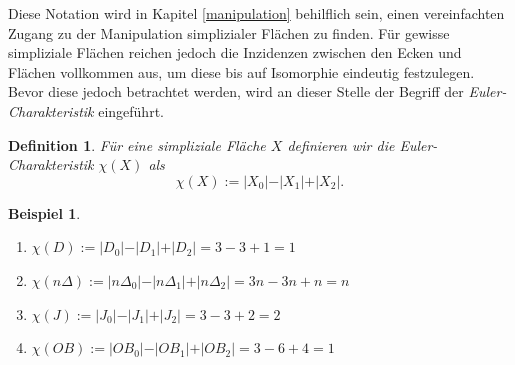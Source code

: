\documentclass[12pt,titlepage,twoside,cleardoublepage]{article}
\theoremstyle{nummermitklammern}
\newtheorem{vor}[temp]{Vorüberlegung}
\newtheorem{bsp}[temp]{Beispiel}
\newtheorem{definition}[temp]{Definition}
\newtheorem{definition}[zahl]{Definition}
\newtheorem{vor}[zahl]{Vorüberlegung}
\newtheorem{bsp}[zahl]{Beispiel}
\numberwithin{equation}{section}
\begin{document}
Diese Notation wird in Kapitel \ref{manipulation} behilflich sein, einen vereinfachten Zugang zu der Manipulation simplizialer Flächen zu finden. Für gewisse simpliziale Flächen reichen jedoch die Inzidenzen zwischen den Ecken und Flächen vollkommen aus, um diese bis auf Isomorphie eindeutig festzulegen. Bevor diese jedoch betrachtet werden, wird an dieser Stelle der Begriff der \emph{Euler-Charakteristik} eingeführt.
\begin{definition}
Für eine simpliziale Fläche $X$ definieren wir die \emph{Euler-Charakteristik} $\chi (X)$ als 
\[
\chi(X):=\vert X_0\vert-\vert X_1\vert+\vert X_2\vert.
\]
\end{definition}
\begin{bsp}
\begin{enumerate}
Beim Betrachten der im obigem Beispiel eingeführten simplizialen Flächen ergeben sich folgende Euler-Charakteristiken:
\item $\chi(D):=\vert D_0\vert-\vert D_1\vert+\vert D_2\vert=3-3+1=1$
\item $\chi(n\Delta):=\vert n\Delta_0\vert-\vert n\Delta_1\vert+\vert n\Delta_2\vert=3n-3n+n=n$
\item $\chi(J):=\vert J_0\vert-\vert J_1\vert+\vert J_2\vert=3-3+2=2$
\item $\chi(OB):=\vert OB_0\vert-\vert OB_1\vert+\vert OB_2\vert=3-6+4=1$
\end{enumerate}
\end{bsp}


\end{document}
